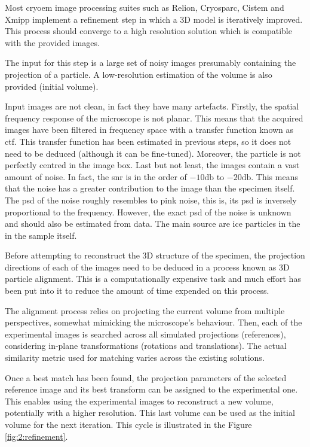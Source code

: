 \documentclass[../main.tex]{subfiles}
\begin{document}
Most \gls{cryoem} image processing suites such as Relion\cite{scheres2021}, Cryosparc\cite{cryosparc}, Cistem\cite{grigorieff2018} and Xmipp\cite{sorzano2021} implement a refinement step in which a 3D model is iteratively improved. This process should converge to a high resolution solution which is compatible with the provided images. 

The input for this step is a large set of noisy images presumably containing the projection of a particle. A low-resolution estimation of the volume is also provided (initial volume)\cite{sorzano2017b}.

Input images are not clean, in fact they have many artefacts. Firstly, the spatial frequency response of the microscope is not planar. This means that the acquired images have been filtered in frequency space with a transfer function known as \gls{ctf}. This transfer function has been estimated in previous steps, so it does not need to be deduced (although it can be fine-tuned). Moreover, the particle is not perfectly centred in the image box. Last but not least, the images contain a vast amount of noise. In fact, the \gls{snr} is in the order of $-10 \si{\decibel}$ to $-20 \si{\decibel}$\cite{sorzano2022}. This means that the noise has a greater contribution to the image than the specimen itself. The \gls{psd} of the noise roughly resembles to pink noise, this is, its \gls{psd} is inversely proportional to the frequency. However, the exact \gls{psd} of the noise is unknown and should also be estimated from data\cite{unser2005}. The main source are ice particles in the in the sample itself.

Before attempting to reconstruct the 3D structure of the specimen, the projection directions of each of the images need to be deduced in a process known as 3D particle alignment\cite{sorzano2017b}. This is a computationally expensive task and much effort has been put into it to reduce the amount of time expended on this process. 

The alignment process relies on projecting the current volume from multiple perspectives, somewhat mimicking the microscope's behaviour. Then, each of the experimental images is searched across all simulated projections (references), considering in-plane transformations (rotations and translations). The actual similarity metric used for matching varies across the existing solutions\cite{sorzano2017b}. 

Once a best match has been found, the projection parameters of the selected reference image and its best transform can be assigned to the experimental one. This enables using the experimental images to reconstruct a new volume, potentially with a higher resolution. This last volume can be used as the initial volume for the next iteration. This cycle is illustrated in the Figure \ref{fig:2:refinement}. 
\end{document}
